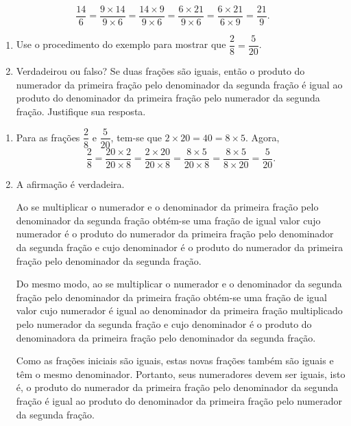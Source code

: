 \documentclass[10 pt,usenames,dvipsnames, oneside]{article}
\begin{document}
$$\dfrac{14}{6} = \dfrac{9 \times 14}{9 \times 6} = \dfrac{14 \times 9}{9 \times 6} = \dfrac{6 \times 21}{9 \times 6} = \dfrac{6 \times 21}{6 \times 9} = \dfrac{21}{9}.$$

\begin{enumerate}
 \item Use o procedimento do exemplo para mostrar que $\dfrac{2}{8} = \dfrac{5}{20}$.
 \item Verdadeirou ou falso? Se duas frações são iguais, então o produto do numerador da primeira fração pelo denominador da segunda fração é igual ao produto do denominador da primeira fração pelo numerador da segunda fração. Justifique sua resposta.
\end{enumerate}

\ifdefined\prof
\begin{solucao}

\begin{enumerate}
\item       Para as frações       $\dfrac{2}{8}$       e
$\dfrac{5}{20}$, tem-se que        $2 \times 20 = 40 = 8 \times 5$. Agora,
$$\dfrac{2}{8} = \dfrac{20 \times 2}{20 \times 8} = \dfrac{2 \times 20}{20 \times
8} = \dfrac{8 \times 5}{20 \times 8} = \dfrac{8 \times 5}{8 \times 20} =
\dfrac{5}{20}.$$
\item       A afirmação é verdadeira.

Ao se multiplicar o numerador e o denominador da primeira fração pelo
denominador da segunda fração obtém-se uma fração de igual valor cujo numerador
é o produto do numerador da primeira fração pelo denominador da segunda fração e
cujo denominador é o produto do numerador da primeira fração pelo denominador da
segunda fração.

Do mesmo modo, ao se multiplicar o numerador e o denominador da segunda fração
pelo denominador da primeira fração obtém-se uma fração de igual valor cujo
numerador é igual ao denominador da primeira fração multiplicado pelo numerador
da segunda fração e cujo denominador é o produto do denominadora da primeira
fração pelo denominador da segunda fração.

Como as frações iniciais são iguais, estas novas frações também são iguais e
têm o mesmo denominador. Portanto, seus numeradores devem ser iguais, isto é, o
produto do numerador da primeira fração pelo denominador da segunda fração é
igual ao produto do denominador da primeira fração pelo numerador da segunda
fração.
\end{enumerate}

\end{solucao}
\fi
\end{document}
